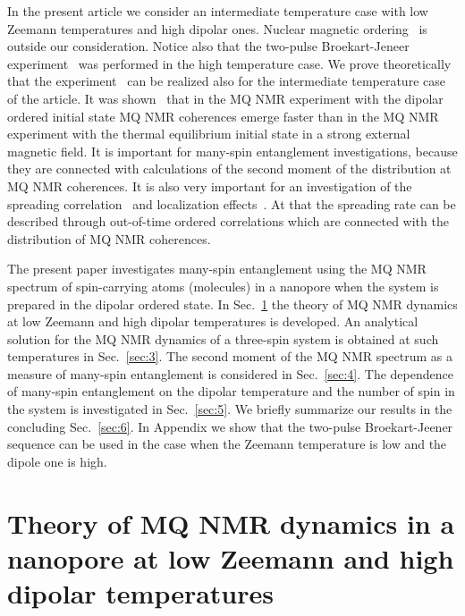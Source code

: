 \documentclass[review]{elsarticle}
\begin{document}
In the present article we consider an intermediate temperature case with low Zeemann temperatures and high dipolar ones. 
Nuclear magnetic ordering~\cite{Abragam_1982} is outside our consideration.
Notice also that the two-pulse Broekart-Jeneer experiment~\cite{Jeener_1967} was performed in the high temperature case.
We prove theoretically that the experiment~\cite{Jeener_1967} can be realized also for the intermediate temperature case of the article. 
It was shown~\cite{Doronin_2011} that in the MQ NMR experiment with the dipolar ordered initial state MQ NMR coherences emerge faster 
than in the MQ NMR experiment with the thermal equilibrium initial state in a strong external magnetic field.
It is important for many-spin entanglement investigations, because they are connected with calculations of the second moment of the distribution at MQ NMR coherences. 
It is also very important for an investigation of the spreading correlation~\cite{Baugh_2001,Baum_1986,S_nchez_2014,Munowitz_1987} and localization effects~\cite{Alvarez_2015,Wei_2018}.
At that the spreading rate can be described through out-of-time ordered correlations which are connected with the distribution of MQ NMR coherences. 

The present paper investigates many-spin entanglement using the MQ NMR spectrum of spin-carrying atoms (molecules) in a nanopore when the system is prepared in the dipolar ordered state.
In Sec.~\ref{sec:2} the theory of MQ NMR dynamics at low Zeemann and high dipolar temperatures is developed.
An analytical solution for the MQ NMR dynamics of a three-spin system is obtained at such temperatures in Sec.~\ref{sec:3}.
The second moment of the MQ NMR spectrum as a measure of many-spin entanglement is considered in Sec.~\ref{sec:4}.
The dependence of many-spin entanglement on the dipolar temperature and the number of spin in the system is investigated in Sec.~\ref{sec:5}.
We briefly summarize our results in the concluding Sec.~\ref{sec:6}.
In Appendix we show that the two-pulse Broekart-Jeener sequence can be used in the case when the Zeemann temperature is low and the dipole one is high.



\section{Theory of MQ NMR dynamics in a nanopore at low Zeemann and high dipolar temperatures}
\label{sec:2}
\end{document}
